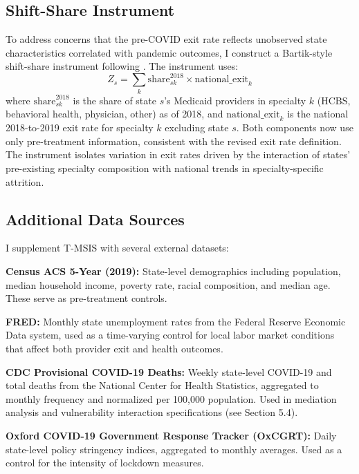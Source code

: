 \documentclass[12pt]{article}
\begin{document}
\subsection{Shift-Share Instrument}

To address concerns that the pre-COVID exit rate reflects unobserved state characteristics correlated with pandemic outcomes, I construct a Bartik-style shift-share instrument following \citet{goldsmithpinkham2020}. The instrument uses:
\begin{equation}
Z_s = \sum_k \text{share}_{sk}^{2018} \times \text{national\_exit}_k
\end{equation}
where $\text{share}_{sk}^{2018}$ is the share of state $s$'s Medicaid providers in specialty $k$ (HCBS, behavioral health, physician, other) as of 2018, and $\text{national\_exit}_k$ is the national 2018-to-2019 exit rate for specialty $k$ excluding state $s$. Both components now use only pre-treatment information, consistent with the revised exit rate definition. The instrument isolates variation in exit rates driven by the interaction of states' pre-existing specialty composition with national trends in specialty-specific attrition.

\subsection{Additional Data Sources}

I supplement T-MSIS with several external datasets:

\textbf{Census ACS 5-Year (2019):} State-level demographics including population, median household income, poverty rate, racial composition, and median age. These serve as pre-treatment controls.

\textbf{FRED:} Monthly state unemployment rates from the Federal Reserve Economic Data system, used as a time-varying control for local labor market conditions that affect both provider exit and health outcomes.

\textbf{CDC Provisional COVID-19 Deaths:} Weekly state-level COVID-19 and total deaths from the National Center for Health Statistics, aggregated to monthly frequency and normalized per 100,000 population. Used in mediation analysis and vulnerability interaction specifications (see Section 5.4).

\textbf{Oxford COVID-19 Government Response Tracker (OxCGRT):} Daily state-level policy stringency indices, aggregated to monthly averages. Used as a control for the intensity of lockdown measures.
\end{document}
